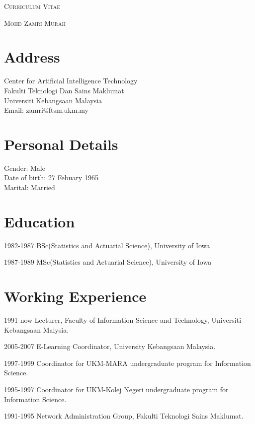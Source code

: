 \documentclass[a4paper]{article}
\begin{document}
\pagestyle{empty}

\begin{center}
\huge{\textsc{Curriculum Vitae}}
\vspace{\baselineskip}

\Large{\textsc{Mohd Zamri Murah}\\
}
\end{center}
\vspace{1.5\baselineskip}

\section{Address}

\begin{flushleft}
Center for Artificial Intelligence Technology\\
  Fakulti Teknologi Dan Sains Maklumat \\
  Universiti Kebangsaan Malaysia \\
   Email: zamri@ftsm.ukm.my
\end{flushleft}


\section{Personal Details}
\begin{flushleft}
  Gender: Male \\
  Date of birth: 27 Febuary 1965 \\
  Marital: Married 
\end{flushleft}


\section{Education}

\begin{CV}
\item[1982-1987] BSc(Statistics and Actuarial Science), University of Iowa
\item[1987-1989] MSc(Statistics and Actuarial  Science), University of Iowa
\end{CV}

\section{Working Experience}
\begin{CV}
\item[1991-now] Lecturer, Faculty of Information Science and Technology, Universiti Kebangsaan Malysia.
\item[2005-2007] E-Learning Coordinator, University Kebangsaan Malaysia.
\item[1997-1999] Coordinator for UKM-MARA undergraduate program for Information Science.
\item[1995-1997] Coordinator for UKM-Kolej Negeri undergraduate program for Information Science.
\item[1991-1995] Network Administration Group, Fakulti Teknologi Sains Maklumat.
\end{CV}
\end{document}
